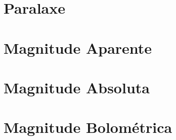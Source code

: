 \section{Paralaxe}


\section{Magnitude Aparente}


\section{Magnitude Absoluta}


\section{Magnitude Bolométrica}

